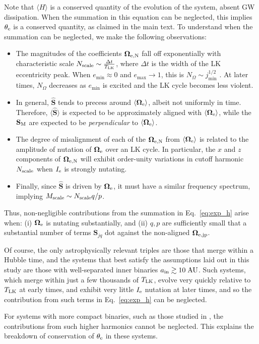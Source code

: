\documentclass[
        fleqn,
        usenatbib,
    ]{mnras}
\newcommand*{\ev}[1]{\langle#1\rangle}
\newcommand*{\bm}[1]{\boldsymbol{\mathbf{#1}}}
\newcommand*{\uv}[1]{\hat{\bm{#1}}}
\begin{document}
Note that $\ev{H}$ is a conserved quantity of the evolution of the system,
absent GW dissipation. When the summation in this equation can be neglected,
this implies $\theta_{\rm e}$ is a conserved quantity, as claimed in the main
text. To understand when the summation can be neglected, we make the following
observations:
\begin{itemize}
    \item The magnitudes of the coefficients $\bm{\Omega}_{\rm e, N}$ fall
        off exponentially with characteristic scale $N_{\rm scale} \sim
        \frac{\Delta t}{T_{\rm LK}}$, where $\Delta t$ is the width of the LK
        eccentricity peak. When $e_{\min} \approx 0$ and $e_{\max} \to 1$, this
        is $N_\Omega \sim j_{\min}^{1/2}$ \citep{anderson2016formation}. At
        later times, $N_\Omega$ decreases as $e_{\min}$ is excited and the LK
        cycle becomes less violent.

    \item In general, $\uv{S}$ tends to precess around $\ev{\bm{\Omega}_{\rm
        e}}$, albeit not uniformly in time. Therefore, $\ev{\uv{S}}$ is expected
        to be approximately aligned with $\ev{\bm{\Omega}_{\rm e}}$, while
        the $\bm{S}_{\rm M}$ are expected to be \emph{perpendicular} to
        $\ev{\bm{\Omega}_{\rm e}}$.

    \item The degree of misalignment of each of the $\bm{\Omega}_{\rm e, N}$
        from $\ev{\bm{\Omega}_{\rm e}}$ is related to the amplitude of nutation
        of $\bm{\Omega}_{\rm e}$ over an LK cycle. In particular, the $x$ and
        $z$ components of $\bm{\Omega}_{\rm e, N}$ will exhibit order-unity
        variations in cutoff harmonic $N_{\rm scale}$ when $I_{\rm e}$ is
        strongly nutating.

    \item Finally, since $\uv{S}$ is driven by $\bm{\Omega}_{\rm e}$, it must
        have a similar frequency spectrum, implying $M_{\rm scale} \sim N_{\rm
        scale}q / p$.
\end{itemize}

Thus, non-negligible contributions from the summation in Eq.~\eqref{eq:exp_h}
arise when: (i) $\bm{\Omega}_{\rm e}$ is nutating substantially, and (ii) $q, p$
are sufficiently small that a substantial number of terms $\bm{S}_{jq}$ dot
against the non-aligned $\bm{\Omega}_{\rm e, jp}$.

Of course, the only astrophysically relevant triples are those that merge within
a Hubble time, and the systems that best satisfy the assumptions laid out in
this study are those with well-separated inner binaries $a_{\rm in} \gtrsim
10\;\mathrm{AU}$. Such systems, which merge within just a few thousands of
$T_{\rm LK}$, evolve very quickly relative to $T_{\rm LK}$ at early times, and
exhibit very little $I_{\rm e}$ nutation at later times, and so the contribution
from such terms in Eq.~\eqref{eq:exp_h} can be neglected.

For systems with more compact binaries, such as those studied in \citep{bin1},
the contributions from such higher harmonics cannot be neglected. This explains
the breakdown of conservation of $\theta_{\rm e}$ in these systems.

\bsp
\label{lastpage} %
\end{document}
